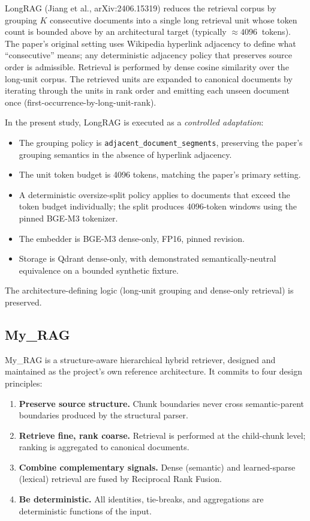 \documentclass[11pt,a4paper]{article}
\begin{document}
LongRAG (Jiang et al., arXiv:2406.15319) reduces the retrieval
corpus by grouping $K$ consecutive documents into a single long
retrieval unit whose token count is bounded above by an
architectural target (typically $\approx \SI{4096}{}$ tokens). The
paper's original setting uses Wikipedia hyperlink adjacency to
define what ``consecutive'' means; any deterministic adjacency
policy that preserves source order is admissible. Retrieval is
performed by dense cosine similarity over the long-unit corpus. The
retrieved units are expanded to canonical documents by iterating
through the units in rank order and emitting each unseen document
once (first-occurrence-by-long-unit-rank).

In the present study, LongRAG is executed as a
\emph{controlled adaptation}:
\begin{itemize}[leftmargin=1.5em,itemsep=0.15em]
  \item The grouping policy is \texttt{adjacent\_document\_segments},
    preserving the paper's grouping semantics in the absence of
    hyperlink adjacency.
  \item The unit token budget is \SI{4096}{} tokens, matching the
    paper's primary setting.
  \item A deterministic oversize-split policy applies to documents
    that exceed the token budget individually; the split produces
    \SI{4096}{}-token windows using the pinned BGE-M3 tokenizer.
  \item The embedder is BGE-M3 dense-only, FP16, pinned revision.
  \item Storage is Qdrant dense-only, with demonstrated
    semantically-neutral equivalence on a bounded synthetic fixture.
\end{itemize}

The architecture-defining logic (long-unit grouping and dense-only
retrieval) is preserved.

\subsection{My\_RAG}

My\_RAG is a structure-aware hierarchical hybrid retriever, designed
and maintained as the project's own reference architecture. It
commits to four design principles:

\begin{enumerate}[leftmargin=1.5em,itemsep=0.15em]
  \item \textbf{Preserve source structure.} Chunk boundaries never
    cross semantic-parent boundaries produced by the structural
    parser.
  \item \textbf{Retrieve fine, rank coarse.} Retrieval is performed
    at the child-chunk level; ranking is aggregated to canonical
    documents.
  \item \textbf{Combine complementary signals.} Dense (semantic)
    and learned-sparse (lexical) retrieval are fused by Reciprocal
    Rank Fusion.
  \item \textbf{Be deterministic.} All identities, tie-breaks, and
    aggregations are deterministic functions of the input.
\end{enumerate}
\end{document}
